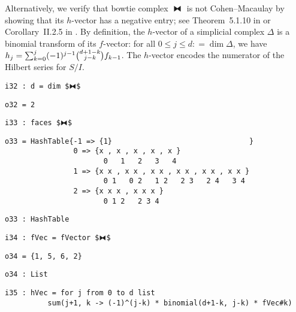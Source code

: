 \documentclass[12pt,leqno]{amsart}
\theoremstyle{definition}
\newcommand{\colequal}{\ensuremath{:\!=}}
\begin{document}
Alternatively, we verify that bowtie complex $⧓$ is not Cohen--Macaulay by
showing that its $h$-vector has a negative entry; see Theorem~5.1.10 in
\cite{BH} or Corollary~II.2.5 in \cite{Stanley}.  By definition, the
$h$-vector of a simplicial complex $\Delta$ is a binomial transform of its
$f\!$-vector: for all $0 \leqslant j \leqslant d \colequal \dim \Delta$, we have
$h_j = \sum_{k=0}^{j} (-1)^{j-1}
\smash{\tbinom{d+1-k}{\raisebox{3pt}{$\scriptstyle j-k$}}} f_{k-1}$.  The
$h$-vector encodes the numerator of the Hilbert series for $S/I$.

\begin{lstlisting}[xleftmargin=10pt, aboveskip=5.0pt, belowskip=1.5pt]
i32 : d = dim $⧓$
\end{lstlisting}
\vfill
\begin{lstlisting}[xleftmargin=10pt, aboveskip=1.5pt, belowskip=1.5pt]
o32 = 2
\end{lstlisting}
\begin{lstlisting}[xleftmargin=10pt, aboveskip=1.5pt, belowskip=1.5pt]
i33 : faces $⧓$
\end{lstlisting}
\begin{lstlisting}[xleftmargin=10pt, lineskip=-10pt, aboveskip=4pt, belowskip=1pt]
o33 = HashTable{-1 => {1}                                }
                0 => {x , x , x , x , x }
                       0   1   2   3   4
                1 => {x x , x x , x x , x x , x x , x x }
                       0 1   0 2   1 2   2 3   2 4   3 4
                2 => {x x x , x x x }
                       0 1 2   2 3 4
\end{lstlisting}
\begin{lstlisting}[xleftmargin=10pt, aboveskip=1.5pt, belowskip=1.5pt]
o33 : HashTable
\end{lstlisting}
\begin{lstlisting}[xleftmargin=10pt, aboveskip=1.5pt, belowskip=1.5pt]
i34 : fVec = fVector $⧓$
\end{lstlisting}
\begin{lstlisting}[xleftmargin=10pt, aboveskip=1.5pt, belowskip=1.5pt]
o34 = {1, 5, 6, 2}
\end{lstlisting}
\begin{lstlisting}[xleftmargin=10pt, aboveskip=1.5pt, belowskip=1.5pt]
o34 : List
\end{lstlisting}
\begin{lstlisting}[xleftmargin=10pt, lineskip=-10pt, aboveskip=4pt, belowskip=1pt]
i35 : hVec = for j from 0 to d list 
          sum(j+1, k -> (-1)^(j-k) * binomial(d+1-k, j-k) * fVec#k)
\end{lstlisting}
\end{document}
